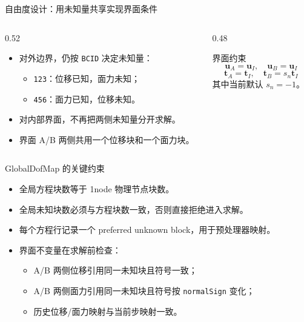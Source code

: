 \documentclass[aspectratio=169,UTF8]{ctexbeamer}
\newcommand{\code}[1]{\texttt{\small #1}}
\begin{document}
\begin{frame}{自由度设计：用未知量共享实现界面条件}
  \begin{columns}
    \begin{column}{0.52\textwidth}
      \begin{itemize}
        \item 对外边界，仍按 \code{BCID} 决定未知量：
          \begin{itemize}
            \item \code{123}：位移已知，面力未知；
            \item \code{456}：面力已知，位移未知。
          \end{itemize}
        \item 对内部界面，不再把两侧未知量分开求解。
        \item 界面 A/B 两侧共用一个位移块和一个面力块。
      \end{itemize}
    \end{column}
    \begin{column}{0.48\textwidth}
      \begin{block}{界面约束}
        \[
          \mathbf{u}_A = \mathbf{u}_I,\quad
          \mathbf{u}_B = \mathbf{u}_I
        \]
        \[
          \mathbf{t}_A = \mathbf{t}_I,\quad
          \mathbf{t}_B = s_n \mathbf{t}_I
        \]
        其中当前默认 $s_n=-1$。
      \end{block}
    \end{column}
  \end{columns}
\end{frame}

\begin{frame}{GlobalDofMap 的关键约束}
  \begin{itemize}
    \item 全局方程块数等于 1node 物理节点块数。
    \item 全局未知块数必须与方程块数一致，否则直接拒绝进入求解。
    \item 每个方程行记录一个 preferred unknown block，用于预处理器映射。
    \item 界面不变量在求解前检查：
      \begin{itemize}
        \item A/B 两侧位移引用同一未知块且符号一致；
        \item A/B 两侧面力引用同一未知块且符号按 \code{normalSign} 变化；
        \item 历史位移/面力映射与当前步映射一致。
      \end{itemize}
  \end{itemize}
\end{frame}
\end{document}
